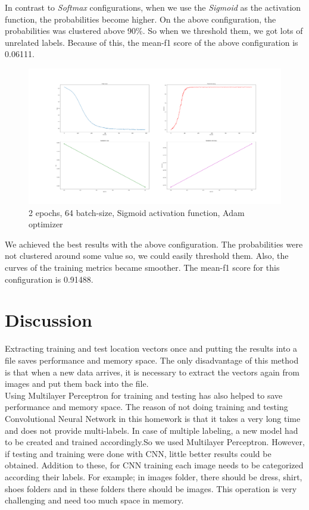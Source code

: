 \documentclass[12pt]{article}
\begin{document}
In contrast to \textit{Softmax} configurations, when we use the \textit{Sigmoid} as the activation function, the probabilities become higher. On the above configuration, the probabilities was clustered above 90\%. So when we threshold them, we got lots of unrelated labels. Because of this, the mean-f1 score of the above configuration is 0.06111.

\begin{figure}[H]
\centering
\includegraphics[width=1\textwidth]{2ep_64btch_sigmoid.png}
\caption{2 epochs, 64 batch-size, Sigmoid activation function, Adam optimizer}
\end{figure}

We achieved the best results with the above configuration. The probabilities were not clustered around some value so, we could easily threshold them. Also, the curves of the training metrics became smoother. The mean-f1 score for this configuration is 0.91488.

\section{Discussion}
Extracting training and test location vectors once and putting the results into a file saves performance and memory space. The only disadvantage of this method is that when a new data arrives, it is necessary to extract the vectors again from images and put them back into the file.\\

Using Multilayer Perceptron for training and testing has also helped to save performance and memory space. The reason of not doing training and testing Convolutional Neural Network in this homework is that it takes a very long time and does not provide multi-labels. In case of multiple labeling, a new model had to be created and trained accordingly.So we used Multilayer Perceptron. However, if testing and training were done with CNN, little better results could be obtained. Addition to these, for CNN training each image needs to be categorized according their labels. For example; in images folder, there should be dress, shirt, shoes folders and in these folders there should be images. This operation is very challenging and need too much space in memory.\\
\end{document}
